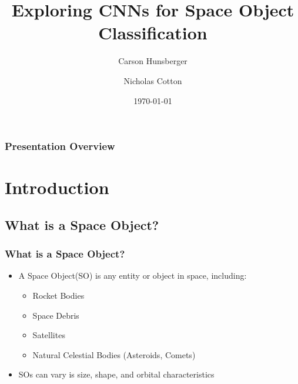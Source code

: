 \documentclass[
	11pt, %
]{beamer}
\title[SO classification with CNN]{Exploring CNNs for Space Object Classification}
\author[Hunsberger \and Cotton]{Carson Hunsberger \and Nicholas Cotton} %
\date[\today]{\today} %
\begin{document}
\begin{frame}
	\titlepage %
\end{frame}
\begin{frame}
	\frametitle{Presentation Overview} %
	
	\tableofcontents %
\end{frame}
\section{Introduction} %
\subsection{What is a Space Object?}

\begin{frame}
	\frametitle{What is a Space Object?}
	\begin{itemize}
		\item
			A Space Object(SO) is any entity or object in space, including:
		\begin{itemize}
			\item
				Rocket Bodies
			\item
				Space Debris
			\item
				Satellites
			\item
				Natural Celestial Bodies (Asteroids, Comets)
			
		\end{itemize}
		\item
			SOs can vary is size, shape, and orbital characteristics

	\end{itemize}

\end{frame}
\end{document}
